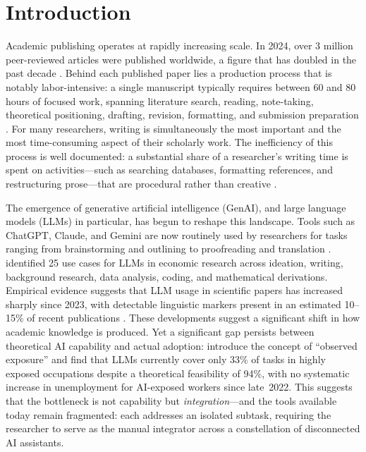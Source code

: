 \documentclass{article}
\begin{document}
\section{Introduction}

Academic publishing operates at rapidly increasing scale. In 2024, over 3 million peer-reviewed articles were published worldwide, a figure that has doubled in the past decade \citep{liang2025quantifying}. Behind each published paper lies a production process that is notably labor-intensive: a single manuscript typically requires between 60 and 80 hours of focused work, spanning literature search, reading, note-taking, theoretical positioning, drafting, revision, formatting, and submission preparation \citep{korinek2023language}. For many researchers, writing is simultaneously the most important and the most time-consuming aspect of their scholarly work. The inefficiency of this process is well documented: a substantial share of a researcher's writing time is spent on activities---such as searching databases, formatting references, and restructuring prose---that are procedural rather than creative \citep{korinek2023language,siu2025augmenting}.

The emergence of generative artificial intelligence (GenAI), and large language models (LLMs) in particular, has begun to reshape this landscape. Tools such as ChatGPT, Claude, and Gemini are now routinely used by researchers for tasks ranging from brainstorming and outlining to proofreading and translation \citep{liang2025quantifying,lee2023chatgpt_medical,banh2023generative}. \citet{korinek2023language} identified 25 use cases for LLMs in economic research across ideation, writing, background research, data analysis, coding, and mathematical derivations. Empirical evidence suggests that LLM usage in scientific papers has increased sharply since 2023, with detectable linguistic markers present in an estimated 10--15\% of recent publications \citep{liang2025quantifying}. These developments suggest a significant shift in how academic knowledge is produced. Yet a significant gap persists between theoretical AI capability and actual adoption: \citet{massenkoff2026labor} introduce the concept of ``observed exposure'' and find that LLMs currently cover only 33\% of tasks in highly exposed occupations despite a theoretical feasibility of 94\%, with no systematic increase in unemployment for AI-exposed workers since late~2022. This suggests that the bottleneck is not capability but \emph{integration}---and the tools available today remain fragmented: each addresses an isolated subtask, requiring the researcher to serve as the manual integrator across a constellation of disconnected AI assistants.
\end{document}

